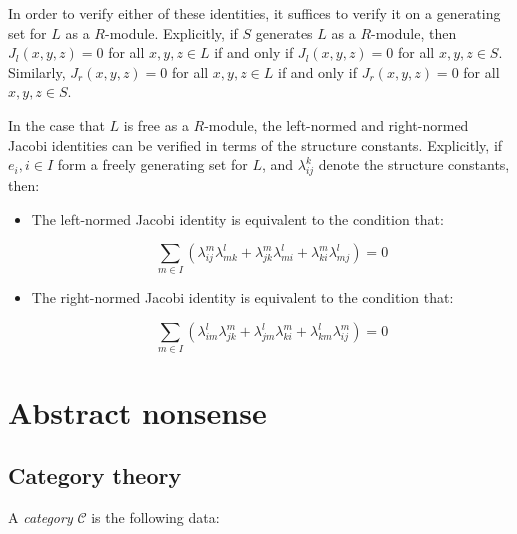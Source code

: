 \documentclass{ucetd}
\begin{document}
In order to verify either of these identities, it suffices to verify
it on a generating set for $L$ as a $R$-module. Explicitly, if $S$
generates $L$ as a $R$-module, then $J_l(x,y,z) = 0$ for all $x,y,z
\in L$ if and only if $J_l(x,y,z) = 0$ for all $x,y,z \in
S$. Similarly, $J_r(x,y,z) = 0$ for all $x,y,z \in L$ if and only if
$J_r(x,y,z) = 0$ for all $x,y,z \in S$.

In the case that $L$ is free as a $R$-module, the left-normed and
right-normed Jacobi identities can be verified in terms of the
structure constants. Explicitly, if $e_i, i \in I$ form a freely
generating set for $L$, and $\lambda_{ij}^k$ denote the structure
constants, then:

\begin{itemize}
\item The left-normed Jacobi identity is equivalent to the condition that:

  $$\sum_{m \in I} (\lambda_{ij}^m\lambda_{mk}^l + \lambda_{jk}^m\lambda_{mi}^l + \lambda_{ki}^m\lambda_{mj}^l) = 0$$

\item The right-normed Jacobi identity is equivalent to the condition
  that:

  $$\sum_{m \in I} (\lambda_{im}^l\lambda_{jk}^m + \lambda_{jm}^l\lambda_{ki}^m + \lambda_{km}^l\lambda_{ij}^m) = 0$$
\end{itemize}

\section{Abstract nonsense}

\subsection{Category theory}\label{appsec:category}

A {\em category} $\mathcal{C}$ is the following data:
\end{document}
